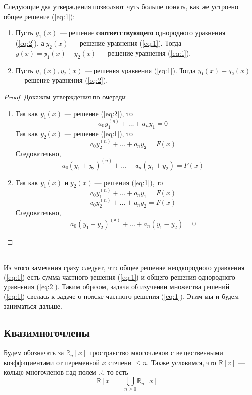 \documentclass[11pt]{article}
\begin{document}
\begin{remark}
    Следующие два утверждения позволяют чуть больше понять, как же устроено общее решение (\ref{eq:1}):
    \begin{enumerate}
        \item Пусть $y_1(x)$ --- решение \textbf{соответствующего} однородного уравнения (\ref{eq:2}), а $y_2(x)$ --- решение уравнения (\ref{eq:1}). Тогда $y(x) = y_1(x) + y_2(x)$ --- решение уравнения (\ref{eq:1}).
        \item Пусть $y_1(x), y_2(x)$ --- решения уравнения (\ref{eq:1}). Тогда $y_1(x) - y_2(x)$ --- решение уравнения (\ref{eq:2}).
    \end{enumerate}
\end{remark}

\begin{proof}
    Докажем утверждения по очереди.
    \begin{enumerate}
        \item Так как $y_1(x)$ --- решение (\ref{eq:2}), то 
        \[a_0 y_1^{(n)} + \ldots + a_n y_1 = 0\]
        Так как $y_2(x)$ --- решение (\ref{eq:1}), то 
        \[a_0 y_2^{(n)} + \ldots + a_n y_2 = F(x)\]
        Следовательно,
        \[a_0 (y_1 + y_2)^{(n)} + \ldots + a_n (y_1 + y_2) = F(x)\]
        \item Так как $y_1(x)$ и $y_2(x)$ --- решения (\ref{eq:1}), то 
        \[a_0 y_1^{(n)} + \ldots + a_n y_1 = F(x)\]
        \[a_0 y_2^{(n)} + \ldots + a_n y_2 = F(x)\]
        Следовательно,
        \[a_0 (y_1 - y_2)^{(n)} + \ldots + a_n (y_1 - y_2) = 0\]
    \end{enumerate}
\end{proof} \leavevmode
\\
Из этого замечания сразу следует, что общее решение неоднородного уравнения (\ref{eq:1}) есть сумма частного решения (\ref{eq:1}) и общего решения однородного уравнения (\ref{eq:2}). Таким образом, задача об изучении множества решений (\ref{eq:1}) свелась к задаче о поиске частного решения (\ref{eq:1}). Этим мы и будем заниматься дальше.

\subsection{Квазимногочлены}

Будем обозначать за $\mathbb{R}_n[x]$ пространство многочленов с вещественными коэффициентами от переменной $x$ степени $\leq n$. Также условимся, что $\mathbb{R}[x]$ --- кольцо многочленов над полем $\mathbb{R}$, то есть
\[\mathbb{R}[x] = \bigcup_{n \geq 0} \mathbb{R}_n[x]\]
\end{document}
